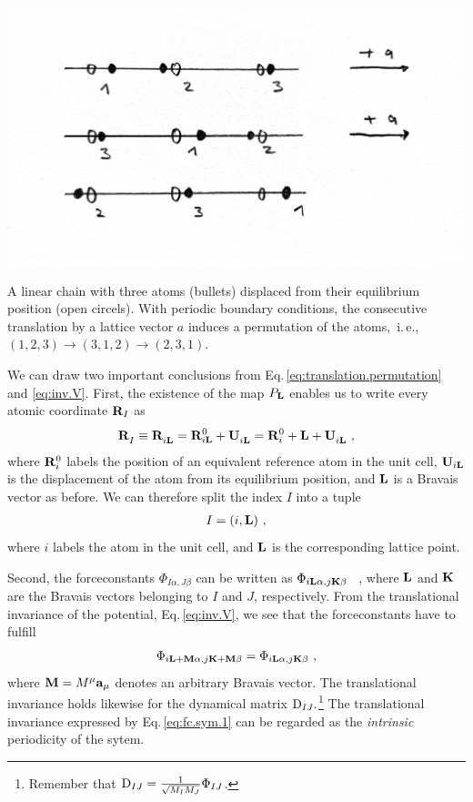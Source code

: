 \begin{marginfigure}
	\centering
	\includegraphics[width=\textwidth]{./data/sketches/permutation1.jpg}
	\caption{ A linear chain with three atoms (bullets) displaced from their equilibrium position (open circels). With periodic boundary conditions, the consecutive translation by a lattice vector $a$ induces a permutation of the atoms,~i.\,e.,~$(1, 2 , 3) \to (3, 1, 2) \to (2, 3, 1)$.}
	\label{fig:translation.permutation}
\end{marginfigure}

We can draw two important conclusions from Eq.\,\eqref{eq:translation.permutation} and \eqref{eq:inv.V}. First, the existence of the map $P_{\bf L}$ enables us to write every atomic coordinate ${\bf R}_I$ as
\begin{align}
	\fD {\bf R}_I \equiv \fD {\bf R}_{i {\bf L}} 
		= {\bf R}^0_{i \b L} + \fD {\bf U}_{i {\bf L}}
		= {\bf R}^0_i + {\bf L} + \fD {\bf U}_{i {\bf L}}~,
	\label{eq:R_iL}
\end{align}
where ${\bf R}^0_i$ labels the position of an equivalent reference atom in the unit cell, ${\bf U}_{i {\bf L}}$ is the displacement of the atom from its equilibrium position, and $\bf L$ is a Bravais vector as before.
We can therefore split the index $I$ into a tuple 
\begin{align}
	I = (i, {\bf L})~,
	\label{eq:I}
\end{align}
where $i$ labels the atom in the unit cell, and $\bf L$ is the corresponding lattice point.



Second, the forceconstants $\Phi_{I \alpha, J \beta}$ can be written as $\Phi_{i {\bf L} \alpha, j {\bf K} \beta}$ ~, where $\bf L$ and ${\bf K}$ are the Bravais vectors belonging to $I$ and $J$, respectively. From the translational invariance of the potential, Eq.\,\eqref{eq:inv.V}, we see that the forceconstants have to fulfill
\begin{align}
	\Phi_{i {\bf L} + \b M \alpha, j {\bf K} + \b M \beta} 
		= \Phi_{i {\bf L} \alpha, j {\bf K} \beta}~,
	\label{eq:fc.sym.1}
\end{align}
where ${\bf M} = M^\mu {\bf a}_\mu$ denotes an arbitrary Bravais vector. The translational invariance holds likewise for the dynamical matrix ${\rm D}_{IJ}.$\footnote{Remember that ${\rm D}_{IJ} = \frac{1}{\sqrt{M_I M_J}} \Phi_{IJ}$.} The translational invariance expressed by Eq.\,\eqref{eq:fc.sym.1} can be regarded as the \emph{intrinsic} periodicity of the sytem.


